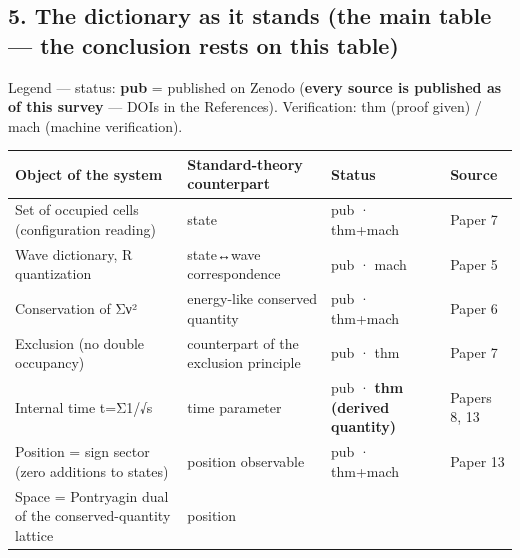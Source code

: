 \documentclass[
]{article}
\newcounter{none} %
\begin{document}
\subsection{5. The dictionary as it stands (the main table --- the
conclusion rests on this
table)}\label{the-dictionary-as-it-stands-the-main-table-the-conclusion-rests-on-this-table}

Legend --- status: \textbf{pub} = published on Zenodo (\textbf{every
source is published as of this survey} --- DOIs in the References).
Verification: thm (proof given) / mach (machine verification).

{\def\LTcaptype{none} %
\begin{longtable}[]{@{}
  >{\raggedright\arraybackslash}p{}
  >{\raggedright\arraybackslash}p{}
  >{\raggedright\arraybackslash}p{}
  >{\raggedright\arraybackslash}p{}@{}}
\toprule\noalign{}
\begin{minipage}[b]{\linewidth}\raggedright
Object of the system
\end{minipage} & \begin{minipage}[b]{\linewidth}\raggedright
Standard-theory counterpart
\end{minipage} & \begin{minipage}[b]{\linewidth}\raggedright
Status
\end{minipage} & \begin{minipage}[b]{\linewidth}\raggedright
Source
\end{minipage} \\
\midrule\noalign{}
\endhead
\bottomrule\noalign{}
\endlastfoot
Set of occupied cells (configuration reading) & state & pub · thm+mach &
Paper 7 \\
Wave dictionary, R quantization & state↔wave correspondence & pub · mach
& Paper 5 \\
Conservation of Σν² & energy-like conserved quantity & pub · thm+mach &
Paper 6 \\
Exclusion (no double occupancy) & counterpart of the exclusion principle
& pub · thm & Paper 7 \\
Internal time t=Σ1/√s & time parameter & pub · \textbf{thm (derived
quantity)} & Papers 8, 13 \\
Position = sign sector (zero additions to states) & position observable
& pub · thm+mach & Paper 13 \\
Space = Pontryagin dual of the conserved-quantity lattice & position

\end{longtable}}
\end{document}
